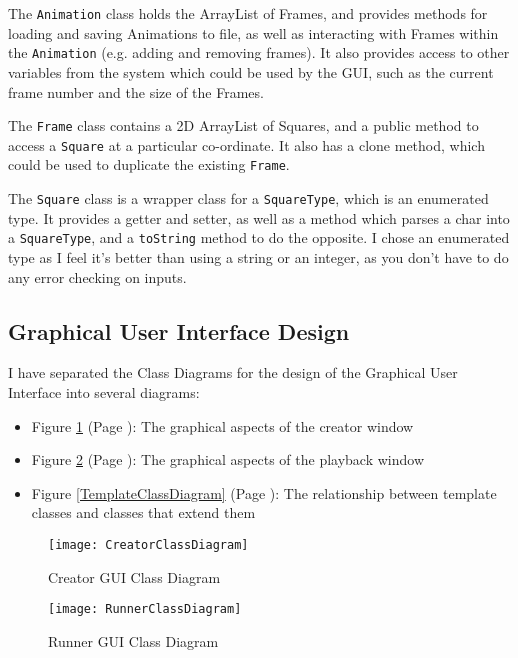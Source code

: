 \documentclass[a4paper, 11pt]{article}
\begin{document}
The \texttt{Animation} class holds the ArrayList of Frames, and provides methods for loading and saving Animations to file, as well as interacting with Frames within the \texttt{Animation} (e.g. adding and removing frames). It also provides access to other variables from the system which could be used by the GUI, such as the current frame number and the size of the Frames.

The \texttt{Frame} class contains a 2D ArrayList of Squares, and a public method to access a \texttt{Square} at a particular co-ordinate. It also has a clone method, which could be used to duplicate the existing \texttt{Frame}.

The \texttt{Square} class is a wrapper class for a \texttt{SquareType}, which is an enumerated type. It provides a getter and setter, as well as a method which parses a char into a \texttt{SquareType}, and a \texttt{toString} method to do the opposite. I chose an enumerated type as I feel it's better than using a string or an integer, as you don't have to do any error checking on inputs.

\subsection{Graphical User Interface Design}

I have separated the Class Diagrams for the design of the Graphical User Interface into several diagrams:
\begin{itemize}
\item Figure \ref{CreatorClassDiagram} (Page \pageref{CreatorClassDiagram}): The graphical aspects of the creator window
\item Figure \ref{RunnerClassDiagram} (Page \pageref{RunnerClassDiagram}): The graphical aspects of the playback window
\item Figure \ref{TemplateClassDiagram} (Page \pageref{TemplateClassDiagram}): The relationship between template classes and classes that extend them
\end{itemize}

\begin{figure}[H]
\centering
\texttt{[image: CreatorClassDiagram]}
\caption{Creator GUI Class Diagram}
\label{CreatorClassDiagram}
\end{figure}

\begin{figure}[H]
\centering
\texttt{[image: RunnerClassDiagram]}
\caption{Runner GUI Class Diagram}
\label{RunnerClassDiagram}
\end{figure}
\end{document}
